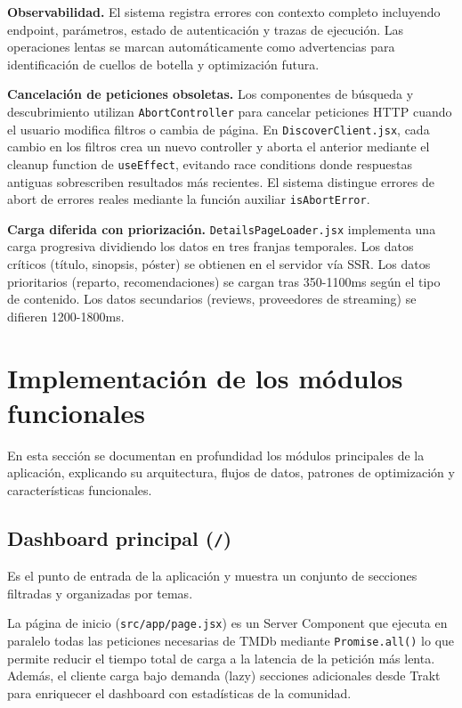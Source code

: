 \textbf{Observabilidad.} El sistema registra errores con contexto completo incluyendo endpoint, parámetros, estado de autenticación y trazas de ejecución. Las operaciones lentas se marcan automáticamente como advertencias para identificación de cuellos de botella y optimización futura.

\textbf{Cancelación de peticiones obsoletas.} Los componentes de búsqueda y descubrimiento utilizan \texttt{AbortController} para cancelar peticiones HTTP cuando el usuario modifica filtros o cambia de página. En \texttt{DiscoverClient.jsx}, cada cambio en los filtros crea un nuevo controller y aborta el anterior mediante el cleanup function de \texttt{useEffect}, evitando race conditions donde respuestas antiguas sobrescriben resultados más recientes. El sistema distingue errores de abort de errores reales mediante la función auxiliar \texttt{isAbortError}.

\textbf{Carga diferida con priorización.} \texttt{DetailsPageLoader.jsx} implementa una carga progresiva dividiendo los datos en tres franjas temporales. Los datos críticos (título, sinopsis, póster) se obtienen en el servidor vía SSR. Los datos prioritarios (reparto, recomendaciones) se cargan tras 350-1100ms según el tipo de contenido. Los datos secundarios (reviews, proveedores de streaming) se difieren 1200-1800ms.

\section{Implementación de los módulos funcionales}

En esta sección se documentan en profundidad los módulos principales de la aplicación, explicando su arquitectura, flujos de datos, patrones de optimización y características funcionales.

\subsection{Dashboard principal (\texttt{/})}

Es el punto de entrada de la aplicación y muestra un conjunto de secciones filtradas y organizadas por temas.

La página de inicio (\texttt{src/app/page.jsx}) es un Server Component que ejecuta en paralelo todas las peticiones necesarias de TMDb mediante \texttt{Promise.all()} lo que permite reducir el tiempo total de carga a la latencia de la petición más lenta. Además, el cliente carga bajo demanda (lazy) secciones adicionales desde Trakt para enriquecer el dashboard con estadísticas de la comunidad.

